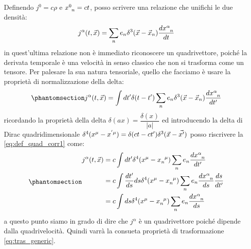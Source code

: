 Definendo $j^0=c\rho$ e $x\indices{^0_n}=ct$, posso scrivere una relazione che unifichi le due densità:
\begin{equation}
    j^\alpha(t,\Vec{x})=\sum_n e_n  \delta^3(\Vec{x}-\Vec{x}_n)\dfrac{dx\indices{^\alpha_n}}{dt}
\end{equation}
in quest'ultima relazione non è immediato riconoscere un quadrivettore, poiché la derivata temporale è una velocità in senso classico che non si trasforma come un tensore. Per palesare la sua natura tensoriale, quello che facciamo è usare la proprietà di normalizzazione della delta:
\begin{equation}\phantomsection\label{eq:def_quad_corr1}
    j^\alpha(t,\Vec{x})=\int dt'\delta(t-t')\sum_n e_n  \delta^3(\Vec{x}-\Vec{x}_n)\dfrac{dx\indices{^\alpha_n}}{dt'}
\end{equation}
ricordando la proprietà della delta $\delta(ax)=\dfrac{\delta(x)}{|a|}$ ed introducendo la delta di Dirac quadridimensionale $\delta^4(x^\mu-x\indices{^{'\mu}})=\delta(ct-ct')\delta^3(\Vec{x}-\Vec{x'})$ posso riscrivere la \eqref{eq:def_quad_corr1} come:
\begin{equation}\phantomsection\label{eq:def_quad_corr2}
    \begin{split}
        j^\alpha(t,\Vec{x})&=c\int dt'\delta^4(x^\mu-x\indices{_n^{\mu}})\sum_n e_n \dfrac{dx\indices{^\alpha_n}}{dt'}\\
        &=c\int \dfrac{dt'}{ds}ds\delta^4(x^\mu-x\indices{_n^{\mu}})\sum_n e_n  \dfrac{dx\indices{^\alpha_n}}{ds}\dfrac{ds}{dt'}\\
        &=c\int ds\delta^4(x^\mu-x\indices{_n^{\mu}})\sum_n e_n \dfrac{dx\indices{^\alpha_n}}{ds}
    \end{split}
    \end{equation}
a questo punto siamo in grado di dire che $j^\alpha$ è un quadrivettore poiché dipende dalla quadrivelocità. Quindi varrà la consueta proprietà di trasformazione \eqref{eq:tras_generic}.

